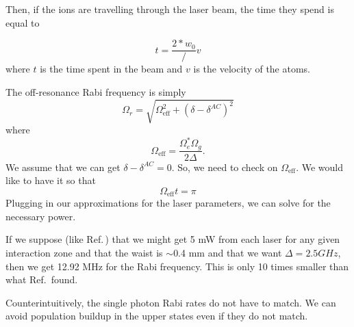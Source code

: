 Then, if the ions are travelling through the laser beam, the time they spend is equal to 

\begin{equation}
t=\frac{2*w_0}/v
\end{equation}
where $t$ is the time spent in the beam and $v$ is the velocity of the atoms. 

The off-resonance Rabi frequency is simply \cite{Young1997363}
\begin{equation}
\Omega_r=\sqrt{\Omega_{\mathrm{eff}}^2+(\delta-\delta^{AC})^2}
\end{equation}
where 
\begin{equation}
\Omega_{\mathrm{eff}}=\frac{\Omega_e^*\Omega_g}{2\Delta}.
\end{equation}
We assume that we can get $\delta-\delta^{AC}=0$. So, we need to check on $\Omega_{\mathrm{eff}}$. We would like to have it so that 
\begin{equation}
\Omega_{\mathrm{eff}}t=\pi
\end{equation}
Plugging in our approximations for the laser parameters, we can solve for the necessary power. 

If we suppose (like Ref.\,\cite{cjeDiss}) that we might get 5 mW from each laser for any given interaction zone and that the waist is $\sim$0.4 mm and that we want $\Delta= 2.5 GHz$, then we get 12.92 MHz for the Rabi frequency. This is only 10 times smaller than what Ref.\,\cite{cjeDiss} found. 

Counterintuitively, the single photon Rabi rates do not have to match. We can avoid population buildup in the upper states even if they do not match. 



